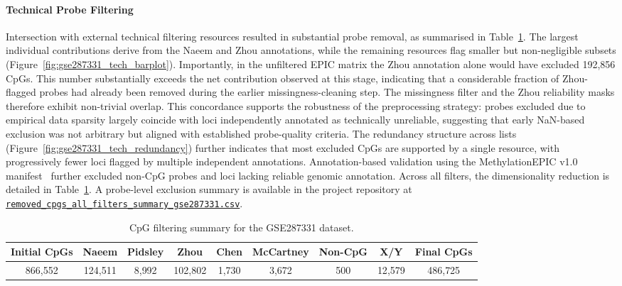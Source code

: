 \paragraph{Technical Probe Filtering}
\label{par:gse287331_step2}



Intersection with external technical filtering resources resulted in substantial probe removal, as summarised in Table~\ref{tab:gse287331_cpg_filtering}. The largest individual contributions derive from the Naeem and Zhou annotations, while the remaining resources flag smaller but non-negligible subsets (Figure~\ref{fig:gse287331_tech_barplot}).  
Importantly, in the unfiltered EPIC matrix the Zhou annotation alone would have excluded 192{,}856 CpGs. This number substantially exceeds the net contribution observed at this stage, indicating that a considerable fraction of Zhou-flagged probes had already been removed during the earlier missingness-cleaning step.
The missingness filter and the Zhou reliability masks therefore exhibit non-trivial overlap. 
This concordance supports the robustness of the preprocessing strategy: probes excluded due to empirical data sparsity largely coincide with loci independently annotated as technically unreliable, suggesting that early NaN-based exclusion was not arbitrary but aligned with established probe-quality criteria.
The redundancy structure across lists (Figure~\ref{fig:gse287331_tech_redundancy}) further indicates that most excluded CpGs are supported by a single resource, with progressively fewer loci flagged by multiple independent annotations.
Annotation-based validation using the MethylationEPIC v1.0 manifest~\cite{IlluminaEPIC} further excluded non-CpG probes and loci lacking reliable genomic annotation. 
Across all filters, the dimensionality reduction is detailed in Table~\ref{tab:gse287331_cpg_filtering}.
A probe-level exclusion summary is available in the project repository at  
\href{https://github.com/elisabettaroviera/THESIS/blob/main/05%20-%20CpG%20list/Removed%20CpGs%20per%20Dataset/removed_cpgs_all_filters_summary_gse287331.csv}
{\texttt{removed\_cpgs\_all\_filters\_summary\_gse287331.csv}}.

\begin{table}[t]
\centering
\caption{CpG filtering summary for the GSE287331 dataset.}
\label{tab:gse287331_cpg_filtering}
\scriptsize
\begin{tabular}{c c c c c c c c c}
\toprule
Initial CpGs &
Naeem &
Pidsley &
Zhou &
Chen &
McCartney &
Non-CpG &
X/Y &
Final CpGs \\
\midrule
866{,}552 &
124{,}511 &
8{,}992 &
102{,}802 &
1{,}730 &
3{,}672 &
500 &
12{,}579 &
486{,}725 \\
\bottomrule
\end{tabular}
\end{table}

